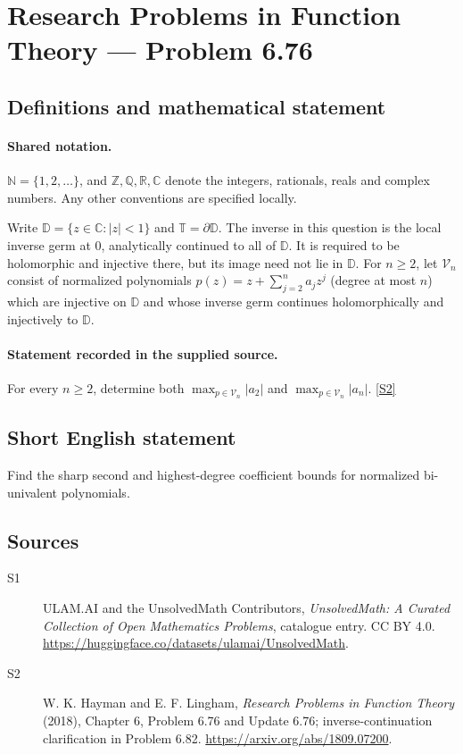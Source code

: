 \documentclass[11pt]{article}
\newcommand{\sref}[2]{\hyperlink{source:#1:#2}{[S#2]}}
\begin{document}
\section{Research Problems in Function Theory — Problem 6.76}\label{statement}

\subsection{Definitions and mathematical statement}

\paragraph{Shared notation.}$\mathbb N=\{1,2,\ldots\}$, and $\mathbb Z,\mathbb Q,\mathbb R,\mathbb C$ denote the integers, rationals, reals and complex numbers. Any other conventions are specified locally.


Write $\mathbb D=\{z\in\mathbb C:|z|<1\}$ and $\mathbb T=\partial\mathbb D$. The inverse in this question is the local inverse germ at $0$, analytically continued to all of $\mathbb D$. It is required to be holomorphic and injective there, but its image need not lie in $\mathbb D$. For $n\ge2$, let $\mathcal V_n$ consist of normalized polynomials $p(z)=z+\sum_{j=2}^n a_jz^j$ (degree at most $n$) which are injective on $\mathbb D$ and whose inverse germ continues holomorphically and injectively to $\mathbb D$.
\paragraph{Statement recorded in the supplied source.}
For every $n\ge2$, determine both $\max_{p\in\mathcal V_n}|a_2|$ and $\max_{p\in\mathcal V_n}|a_n|$. \sref{statement}{2}
\subsection{Short English statement}
Find the sharp second and highest-degree coefficient bounds for normalized bi-univalent polynomials.
\subsection{Sources}
\begin{description}
\item[\hypertarget{source:statement:1}{S1}] ULAM.AI and the UnsolvedMath Contributors, \emph{UnsolvedMath: A Curated Collection of Open Mathematics Problems}, catalogue entry. CC BY 4.0. \url{https://huggingface.co/datasets/ulamai/UnsolvedMath}.
\item[\hypertarget{source:statement:2}{S2}] W. K. Hayman and E. F. Lingham, \emph{Research Problems in Function Theory} (2018), Chapter 6, Problem 6.76 and Update 6.76; inverse-continuation clarification in Problem 6.82. \url{https://arxiv.org/abs/1809.07200}.
\end{description}
\label{end:statement}
\end{document}
